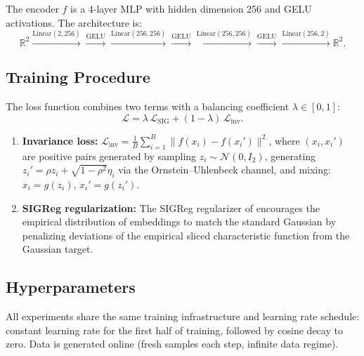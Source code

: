 The encoder $f$ is a 4-layer MLP with hidden dimension 256 and GELU activations. The architecture is:
\begin{equation}
    \mathbb{R}^2 \xrightarrow{\text{Linear}(2,256)} \xrightarrow{\text{GELU}} \xrightarrow{\text{Linear}(256,256)} \xrightarrow{\text{GELU}} \xrightarrow{\text{Linear}(256,256)} \xrightarrow{\text{GELU}} \xrightarrow{\text{Linear}(256,2)} \mathbb{R}^2.
\end{equation}

\subsection{Training Procedure}

The loss function combines two terms with a balancing coefficient $\lambda \in [0, 1]$:
\begin{equation}\label{eq:loss-combined}
    \mathcal{L} = \lambda\,\mathcal{L}_{\mathrm{SIG}} + (1 - \lambda)\,\mathcal{L}_{\mathrm{inv}}.
\end{equation}
\begin{enumerate}
    \item \textbf{Invariance loss:} $\mathcal{L}_{\text{inv}} = \frac{1}{B}\sum_{i=1}^B \|f(x_i) - f(x_i')\|^2$, where $(x_i, x_i')$ are positive pairs generated by sampling $z_i \sim \mathcal{N}(0, I_2)$, generating $z_i' = \rho z_i + \sqrt{1-\rho^2}\eta_i$ via the Ornstein--Uhlenbeck channel, and mixing: $x_i = g(z_i)$, $x_i' = g(z_i')$.
    \item \textbf{SIGReg regularization:} The SIGReg regularizer of \citet{balestriero2025lejepa} encourages the empirical distribution of embeddings to match the standard Gaussian by penalizing deviations of the empirical sliced characteristic function from the Gaussian target.
\end{enumerate}

\subsection{Hyperparameters}

All experiments share the same training infrastructure and learning rate schedule: constant learning rate for the first half of training, followed by cosine decay to zero. Data is generated online (fresh samples each step, infinite data regime). 

